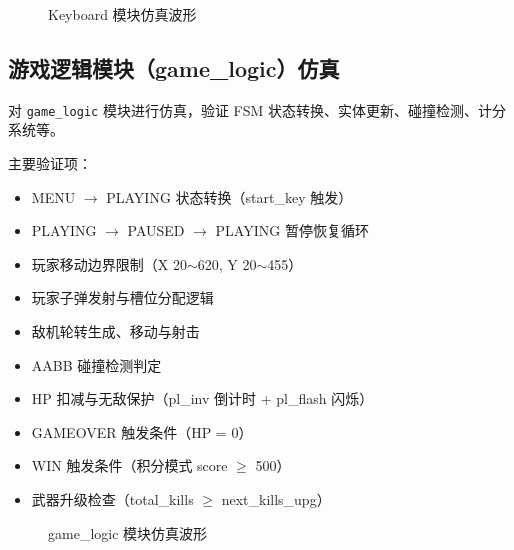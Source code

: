 \documentclass[12pt,a4paper]{ctexart}
\begin{document}
\begin{figure}[H]
\centering
\caption{Keyboard 模块仿真波形}
\label{fig:sim_keyboard}
\end{figure}

\subsection{游戏逻辑模块（game\_logic）仿真}

对 \texttt{game\_logic} 模块进行仿真，验证 FSM 状态转换、实体更新、碰撞检测、计分系统等。

主要验证项：
\begin{itemize}
    \item MENU $\rightarrow$ PLAYING 状态转换（start\_key 触发）
    \item PLAYING $\rightarrow$ PAUSED $\rightarrow$ PLAYING 暂停恢复循环
    \item 玩家移动边界限制（X 20$\sim$620, Y 20$\sim$455）
    \item 玩家子弹发射与槽位分配逻辑
    \item 敌机轮转生成、移动与射击
    \item AABB 碰撞检测判定
    \item HP 扣减与无敌保护（pl\_inv 倒计时 + pl\_flash 闪烁）
    \item GAMEOVER 触发条件（HP = 0）
    \item WIN 触发条件（积分模式 score $\ge$ 500）
    \item 武器升级检查（total\_kills $\ge$ next\_kills\_upg）
\end{itemize}

\begin{figure}[H]
\centering
\caption{game\_logic 模块仿真波形}
\label{fig:sim_logic}
\end{figure}
\end{document}
